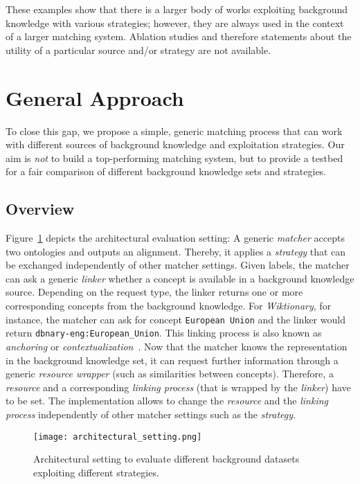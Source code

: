 \documentclass[runningheads]{llncs}
\begin{document}
These examples show that there is a larger body of works exploiting background knowledge with various strategies; however, they are always used in the context of a larger matching system. Ablation studies and therefore statements about the utility of a particular source and/or strategy are not available.



\section{General Approach}
\label{sec:approach}
To close this gap, we propose a simple, generic matching process that can work with different sources of background knowledge and exploitation strategies. Our aim is \emph{not} to build a top-performing matching system, but to provide a testbed for a fair comparison of different background knowledge sets and strategies.

\subsection{Overview}
Figure~\ref{fig:architecture} depicts the architectural evaluation setting: A generic \textit{matcher} accepts two ontologies and outputs an alignment. Thereby, it applies a \textit{strategy} that can be exchanged independently of other matcher settings. Given labels, the matcher can ask a generic \textit{linker} whether a concept is available in a background knowledge source. Depending on the request type, the linker returns one or more corresponding concepts from the background knowledge. For \textit{Wiktionary}, for instance, the matcher can ask for concept \texttt{European Union} and the linker would return \texttt{dbnary-eng:European\_Union}. This linking process is also known as \emph{anchoring} or \emph{contextualization}~\cite{euzenat_ontology_2013_ch_7}.
Now that the matcher knows the representation in the background knowledge set, it can request further information through a generic \textit{resource wrapper} (such as similarities between concepts). Therefore, a \textit{resource} and a corresponding \textit{linking process} (that is wrapped by the \textit{linker}) have to be set. The implementation allows to change the \textit{resource} and the \textit{linking process} independently of other matcher settings such as the \textit{strategy}. 

\begin{figure}
    \centering
    \texttt{[image: architectural\_setting.png]}
    \caption{Architectural setting to evaluate different background datasets exploiting different strategies.}
    \label{fig:architecture}
\end{figure}
\end{document}
